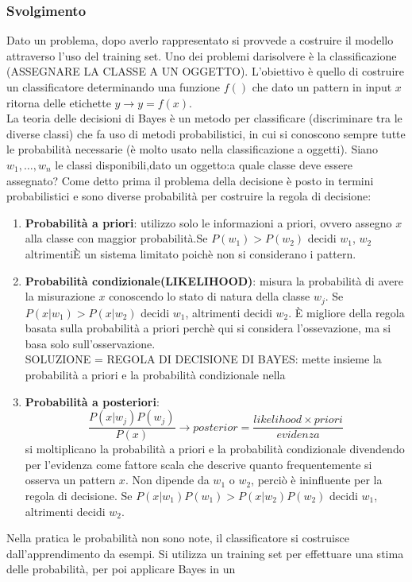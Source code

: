 \documentclass{article}
\begin{document}
\subsubsection*{Svolgimento}
Dato un problema, dopo averlo rappresentato si provvede a costruire il modello attraverso l'uso del training set. Uno dei problemi darisolvere è la classificazione (ASSEGNARE LA CLASSE A UN OGGETTO). L'obiettivo è quello di costruire un classificatore determinando una funzione $f()$ che dato un pattern in input $x$ ritorna delle etichette $y \rightarrow y =f(x)$.\\
La teoria delle decisioni di Bayes è un metodo per classificare (discriminare tra le diverse classi) che fa uso di metodi probabilistici, in cui si conoscono sempre tutte le probabilità necessarie (è molto usato nella classificazione a oggetti).
Siano $w_1, \dots, w_n$ le classi disponibili,dato un oggetto:a quale classe deve essere assegnato? Come detto prima il problema della decisione è posto in termini probabilistici e sono diverse probabilità per costruire la regola di decisione:
\begin{enumerate}
    \item \textbf{Probabilità a priori}: utilizzo solo le informazioni a priori, ovvero assegno $x$ alla classe con maggior probabilità.Se $P(w_1)> P(w_2)$ decidi $w_1$, $w_2$ altrimentiÈ un sistema limitato poichè non si considerano i pattern.
    \item \textbf{Probabilità condizionale(LIKELIHOOD)}: misura la probabilità di avere la misurazione $x$ conoscendo lo stato di natura della classe $w_j$. Se $P(x|w_1) > P(x|w_2)$ decidi $w_1$, altrimenti decidi $w_2$. È migliore della regola basata sulla probabilità a priori perchè qui si considera l'ossevazione, ma si basa solo sull'osservazione.\\ SOLUZIONE = REGOLA DI DECISIONE DI BAYES: mette insieme la probabilità a priori e la probabilità condizionale nella 
    \item \textbf{Probabilità a posteriori}: $$ \frac{P(x | w_j)P(w_j)}{P(x)} \rightarrow posterior = \frac{likelihood \times priori}{evidenza}$$ 
    si moltiplicano la probabilità a priori e la probabilità condizionale divendendo per l’evidenza come fattore scala che descrive quanto frequentemente si osserva un pattern $x$. Non dipende da $w_1$ o $w_2$, perciò è ininfluente per la regola di decisione. Se $P(x|w_1)P(w_1)> P(x|w_2)P(w_2)$ decidi $w_1$, altrimenti decidi $w_2$. 
\end{enumerate}
Nella pratica le probabilità non sono note, il classificatore si costruisce dall’apprendimento da esempi. Si utilizza un training set per effettuare una stima delle probabilità, per poi applicare Bayes in un 
\end{document}
